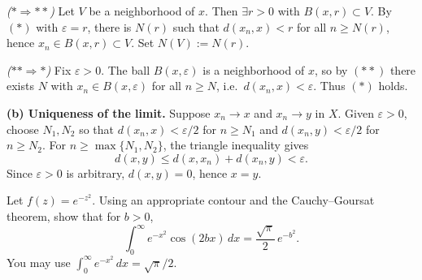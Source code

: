 \begin{solution}
\emph{($\ast\Rightarrow\ast\ast$)} Let $V$ be a neighborhood of $x$. Then $\exists r>0$ with $B(x,r)\subset V$. By $(\ast)$ with $\varepsilon=r$, there is $N(r)$ such that $d(x_n,x)<r$ for all $n\ge N(r)$, hence $x_n\in B(x,r)\subset V$. Set $N(V):=N(r)$.

\smallskip
\noindent
\emph{($\ast\ast\Rightarrow\ast$)} Fix $\varepsilon>0$. The ball $B(x,\varepsilon)$ is a neighborhood of $x$, so by $(\ast\ast)$ there exists $N$ with $x_n\in B(x,\varepsilon)$ for all $n\ge N$, i.e.\ $d(x_n,x)<\varepsilon$. Thus $(\ast)$ holds.
\par\medskip\noindent\textbf{(b) Uniqueness of the limit.}
Suppose $x_n\to x$ and $x_n\to y$ in $X$. Given $\varepsilon>0$,
choose $N_1,N_2$ so that $d(x_n,x)<\varepsilon/2$ for $n\ge N_1$
and $d(x_n,y)<\varepsilon/2$ for $n\ge N_2$.
For $n\ge\max\{N_1,N_2\}$, the triangle inequality gives
\[
 d(x,y)\le d(x,x_n)+d(x_n,y)<\varepsilon.
\]
Since $\varepsilon>0$ is arbitrary, $d(x,y)=0$, hence $x=y$.
\end{solution}

\begin{problem}[CP-IV-0114]
\label{prob:cp-iv-0114}
Let $f(z)=e^{-z^{2}}$. Using an appropriate contour and the Cauchy--Goursat theorem, show that for $b>0$,
	\[
	\int_{0}^{\infty} e^{-x^{2}}\cos(2bx)\,dx=\frac{\sqrt{\pi}}{2}\,e^{-b^{2}}.
	\]
	You may use $\int_{0}^{\infty} e^{-x^{2}}\,dx=\sqrt{\pi}/2$.
\end{problem}



